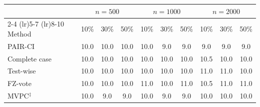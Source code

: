 \begin{tabular}{lccccccccc}
    \toprule
                  & \multicolumn{3}{c}{$n{=}500$} & \multicolumn{3}{c}{$n{=}1000$} & \multicolumn{3}{c}{$n{=}2000$} \\
    \cmidrule(lr){2-4} \cmidrule(lr){5-7} \cmidrule(lr){8-10}
    Method        & 10\% & 30\% & 50\%            & 10\%  & 30\%  & 50\%           & 10\%  & 30\%  & 50\%  \\
    \midrule
    PAIR-CI       & 10.0 & 10.0 & 10.0 & 10.0 &  9.0 &  9.0 &  9.0 &  9.0 &  9.0 \\
    Complete case & 10.0 & 10.0 & 10.0 & 10.0 & 10.0 & 10.0 & 10.5 & 10.0 & 10.0 \\
    Test-wise     & 10.0 & 10.0 & 10.0 & 10.0 & 10.0 & 10.0 & 11.0 & 11.0 & 10.0 \\
    FZ-vote       & 10.0 & 10.0 & 10.0 & 11.0 & 10.0 & 11.0 & 10.5 & 11.0 & 11.0 \\
    MVPC$^\ddagger$ & 10.0 &  9.0 &  9.0 & 10.0 &  9.0 &  9.0 & 10.0 & 10.0 & 10.0 \\
    \bottomrule
\end{tabular}
